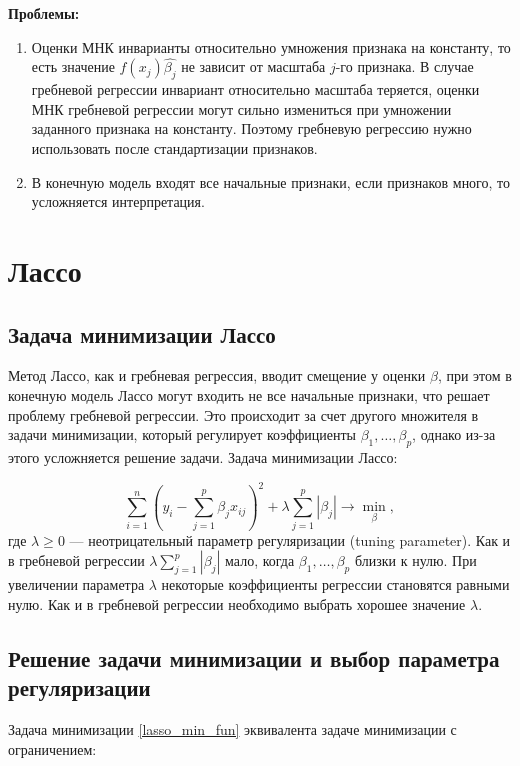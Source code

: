 \documentclass[specialist,
               subf,href,colorlinks=true, 12pt,a4paper]{article} %
\numberwithin{equation}{section}
\begin{document}
\textbf{Проблемы:}
\begin{enumerate}
\item Оценки МНК инварианты относительно умножения признака на константу, то есть значение $f(x_j)\hat{\beta_j}$ не зависит от масштаба $j$-го признака. В случае гребневой регрессии инвариант относительно масштаба теряется, оценки МНК гребневой регрессии могут сильно измениться при умножении заданного признака на константу. Поэтому гребневую регрессию нужно использовать после стандартизации признаков.
\item В конечную модель входят все начальные признаки, если признаков много, то усложняется интерпретация. 
\end{enumerate}

\section{Лассо}

\subsection{Задача минимизации Лассо}

Метод Лассо, как и гребневая регрессия, вводит смещение у оценки $\beta$, при этом в конечную модель Лассо могут входить не все начальные признаки, что решает проблему гребневой регрессии. Это происходит за счет другого множителя в задачи минимизации, который регулирует коэффициенты $\beta_1, \ldots, \beta_p$, однако из-за этого усложняется решение задачи. Задача минимизации Лассо:

\begin{equation}\label{lasso_min_fun}
\sum_{i=1}^n(y_i - \sum_{j=1}^p \beta_j x_{ij})^2 + \lambda \sum_{j = 1}^p |\beta_j| \rightarrow \min_{\beta},
\end{equation}
где $\lambda \geq 0$ --- неотрицательный параметр регуляризации (tuning parameter). Как и в гребневой регрессии $\lambda \sum_{j = 1}^p |\beta_j|$ мало, когда $\beta_1, \ldots, \beta_p$ близки к нулю. При увеличении параметра $\lambda$ некоторые коэффициенты регрессии становятся равными нулю. Как и в гребневой регрессии необходимо выбрать хорошее значение $\lambda$.


\subsection{Решение задачи минимизации и выбор параметра регуляризации}

Задача минимизации \eqref{lasso_min_fun} эквивалента задаче минимизации с ограничением:
\end{document}
